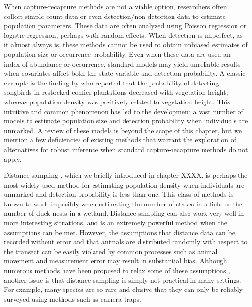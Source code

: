 When capture-recapture methods are not a viable option, researchers
often collect simple count data or even detection/non-detection data
to estimate population parameters. These data are often analyzed using
Poisson regression or logistic regression, perhaps with random
effects. When detection is imperfect, as it almost always is,
these methods cannot be used to obtain unbiased estimates of
population size or occurrence probability. Even when these data are
used an index of abundance or occurrence, standard models may yield
unreliable results when covariates affect both the state variable and
detection probability. A classic example is the finding by
\citet{bibby_buckland:1987} who reported that the probability of detecting
songbirds in restocked confier plantations decreased with vegetation
height; whereas population density was positively related to
vegetation height. This intuitive and common phenomenon has led to the
development a vast number of models to estimate population size and
detection probability when individuals are unmarked. A review of these
models is beyond the scope of this
chapter, but we mention a few deficiencies of existing methods
that warrant the exploration of alternatives for robust inference when
standard capture-recapture methods do not apply.

Distance sampling \citep{buckland_etal:2001}, which we briefly introduced in chapter XXXX,
is perhaps the most widely used method for
estimating population density when individuals are unmarked and
detection probability is less than one. This class of methods is known
to work impecibly when estimating the number of stakes in a field or
the number of duck nests in a wetland.
Distance sampling can also work very well in
more interesting situations, and is an extremely powerful method when
the assumptions can be met. However, the assumptions that distance
data can be recorded without error and that animals are distributed
randomly with respect to the transect can be easily violated by
common processes such as animal movement and measurement error may result in
substantial bias. Although numerous methods have been proposed to
relax some of these assumptions
\citet{royle_etal:2004,borchers_etal:1998,johnson_etal:2010,chandler_etal:2011},
another issue is that distance
sampling is simply not practical in many settings. For example, many
species are so rare and elusive that they can only be reliably
surveyed using methods such as camera traps.

